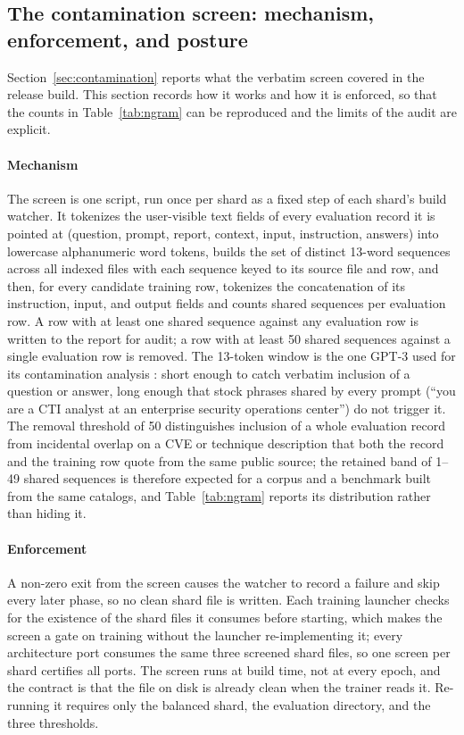 \documentclass[twocolumn]{svjour3}
\begin{document}
\begin{appendix}
\section{The contamination screen: mechanism, enforcement, and posture}\label{app:contamination}
Section~\ref{sec:contamination} reports what the verbatim screen covered in the release build. This section records how it works and how it is enforced, so that the counts in Table~\ref{tab:ngram} can be reproduced and the limits of the audit are explicit.

\paragraph{Mechanism}
The screen is one script, run once per shard as a fixed step of each shard's build watcher. It tokenizes the user-visible text fields of every evaluation record it is pointed at (question, prompt, report, context, input, instruction, answers) into lowercase alphanumeric word tokens, builds the set of distinct 13-word sequences across all indexed files with each sequence keyed to its source file and row, and then, for every candidate training row, tokenizes the concatenation of its instruction, input, and output fields and counts shared sequences per evaluation row. A row with at least one shared sequence against any evaluation row is written to the report for audit; a row with at least 50 shared sequences against a single evaluation row is removed. The 13-token window is the one GPT-3 used for its contamination analysis \cite{brown2020gpt3}: short enough to catch verbatim inclusion of a question or answer, long enough that stock phrases shared by every prompt (``you are a CTI analyst at an enterprise security operations center'') do not trigger it. The removal threshold of 50 distinguishes inclusion of a whole evaluation record from incidental overlap on a CVE or technique description that both the record and the training row quote from the same public source; the retained band of 1--49 shared sequences is therefore expected for a corpus and a benchmark built from the same catalogs, and Table~\ref{tab:ngram} reports its distribution rather than hiding it.

\paragraph{Enforcement}
A non-zero exit from the screen causes the watcher to record a failure and skip every later phase, so no clean shard file is written. Each training launcher checks for the existence of the shard files it consumes before starting, which makes the screen a gate on training without the launcher re-implementing it; every architecture port consumes the same three screened shard files, so one screen per shard certifies all ports. The screen runs at build time, not at every epoch, and the contract is that the file on disk is already clean when the trainer reads it. Re-running it requires only the balanced shard, the evaluation directory, and the three thresholds.


\end{appendix}
\end{document}
